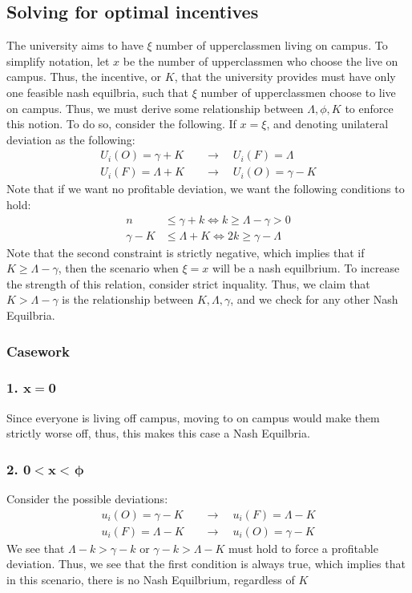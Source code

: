 \documentclass[12pt]{article}
\begin{document}
\subsection{Solving for optimal incentives}
The university aims to have $\xi$ number of upperclassmen living on campus. To simplify notation, let $x$ be the number of upperclassmen who choose the live on campus. Thus, the incentive, or $K$, that the university provides must have only one feasible nash equilbria, such that $\xi$ number of upperclassmen choose to live on campus. Thus, we must derive some relationship between $\Lambda, \phi, K$ to enforce this notion. To do so, consider the following. If $x = \xi$, and denoting unilateral deviation as the following:
\begin{align*}
    U_i(O) = \gamma + K \quad &\to \quad U_i(F) = \Lambda\\
    U_i(F) = \Lambda + K \quad &\to \quad U_i(O) = \gamma - K
\end{align*}
Note that if we want no profitable deviation, we want the following conditions to hold:
\begin{align*}
    n &\leq \gamma + k \iff k \geq \Lambda - \gamma > 0 \\
    \gamma - K & \leq \Lambda + K \iff 2k \geq \gamma - \Lambda
\end{align*}
Note that the second constraint is strictly negative, which implies that if $K \geq \Lambda - \gamma$, then the scenario when $\xi = x$ will be a nash equilbrium. To increase the strength of this relation, consider strict inquality. Thus, we claim that $K > \Lambda - \gamma$ is the relationship between $K, \Lambda, \gamma$, and we check for any other Nash Equilbria. 
\subsubsection{Casework}
\subsubsection*{1. $\mathbf{x = 0}$}
Since everyone is living off campus, moving to on campus would make them strictly worse off, thus, this makes this case a Nash Equilbria. 
\subsubsection*{2. $\mathbf{0 < x <} \hspace{1pt} \bm{\phi}$}
Consider the possible deviations:
\begin{align*}
    u_i(O) = \gamma - K \quad &\to \quad u_i(F) = \Lambda - K \\
    u_i(F) = \Lambda - K\quad &\to \quad u_i(O) = \gamma - K
\end{align*}
We see that $\Lambda - k > \gamma - k$ or $\gamma - k > \Lambda - K$ must hold to force a profitable deviation. Thus, we see that the first condition is always true, which implies that in this scenario, there is no Nash Equilbrium, regardless of $K$
\end{document}
